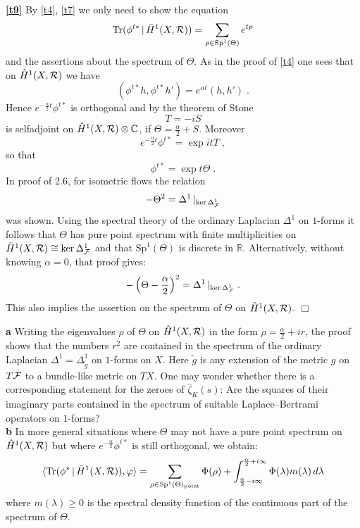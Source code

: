 \documentclass[11pt,leqno]{article}
\newcommand{\Sp}{\mathrm{Sp}}
\newcommand{\hzeta}{\hat{\zeta}}
\newcommand{\C}{{\mathbb{C}}}
\newcommand{\R}{{\mathbb{R}}}
\newcommand{\Tr}{\mathrm{Tr}}
\newcommand{\Fh}{{\cal F}}
\newcommand{\Rh}{{\cal R}}
\newcommand{\oH}{\bar{H}}
\newcommand{\tei}{\, | \,}
\newenvironment{remarksnn}{\bigskip \noindent {\bf Remarks}}{}
\newenvironment{proofof}{\bigskip \noindent {\bf Proof of}}{\mbox{}\hfill$\Box$}
\begin{document}
\begin{proofof}
  {\bf \ref{t9}}
By \ref{t4}, \ref{t7} we only need to show the equation
\begin{equation}
  \label{eq:24}
  \Tr (\phi^{t*} \tei \oH^1 (X,\Rh)) = \sum_{\rho \in \Sp^1 (\Theta)} e^{t \rho}
\end{equation}
and the assertions about the spectrum of $\Theta$. As in the proof of \ref{t4} one sees that on $\hat{H}^1 (X,\Rh)$ we have
\[
( \phi^{t*} h , \phi^{t*} h') = e^{\alpha t} (h , h') \; .
\]
Hence $e^{-\frac{\alpha}{2} t} \phi^{t*}$ is orthogonal and by the theorem of Stone
\[
T = -iS
\]
is selfadjoint on $\hat{H}^1 (X,\Rh) \otimes \C$, if $\Theta = \frac{\alpha}{2} + S$. Moreover
\[
e^{-\frac{\alpha}{2} t} \phi^{t*} = \exp it T \; ,
\]
so that
\begin{equation}
  \label{eq:25}
  \phi^{t*} = \exp t \Theta \; .
\end{equation}
In \cite{DS2} proof of 2.6, for isometric flows the relation
\[
-\Theta^2 = \Delta^1 \, |_{\ker \Delta^1_{\Fh}}
\]
was shown. Using the spectral theory of the ordinary Laplacian $\Delta^1$ on $1$-forms it follows that $\Theta$ has pure point spectrum with finite multiplicities on $\oH^1 (X,\Rh) \cong \ker \Delta^1_{\Fh}$ and that $\Sp^1 (\Theta)$ is discrete in $\R$. Alternatively, without knowing $\alpha = 0$, that proof gives:
\[
- \left( \Theta - \frac{\alpha}{2} \right)^2 = \Delta^1 \, |_{\ker \Delta^1_{\Fh}} \; .
\]
This also implies the assertion on the spectrum of $\Theta$ on $\hat{H}^1 (X,\Rh)$. 
\end{proofof}

\begin{remarksnn}
{\bf a} \quad Writing the eigenvalues $\rho$ of $\Theta$ on $\hat{H}^1 (X, \Rh)$ in the form $\rho = \frac{\alpha}{2} + ir$, the proof shows that the numbers $r^2$ are contained in the spectrum of the ordinary Laplacian $\Delta^1 = \Delta^1_{\tilde{g}}$ on $1$-forms on $X$. Here $\tilde{g}$ is any extension of the metric $g$ on $T\Fh$ to a bundle-like metric on $TX$. One may wonder whether there is a corresponding statement for the zeroes of $\hzeta_K (s)$: Are the squares of their imaginary parts contained in the spectrum of suitable Laplace--Bertrami operators on $1$-forms?\\
{\bf b} \quad In more general situations where $\Theta$ may not have a pure point spectrum on $\hat{H}^1 (X,\Rh)$ but where $e^{-\frac{\alpha}{2}} \phi^{t*}$ is still orthogonal, we obtain:
\[
\langle \Tr (\phi^* \tei \oH^1 (X,\Rh)) , \varphi \rangle = \sum_{\rho \in \Sp^1 (\Theta)_{\mathrm{point}}} \Phi (\rho) + \int^{\frac{\alpha}{2} + i \infty}_{\frac{\alpha}{2} - i \infty} \Phi (\lambda) m (\lambda) \, d \lambda
\]
where $m (\lambda) \ge 0$ is the spectral density function of the continuous part of the spectrum of $\Theta$. 
\end{remarksnn}
%
\end{document}
